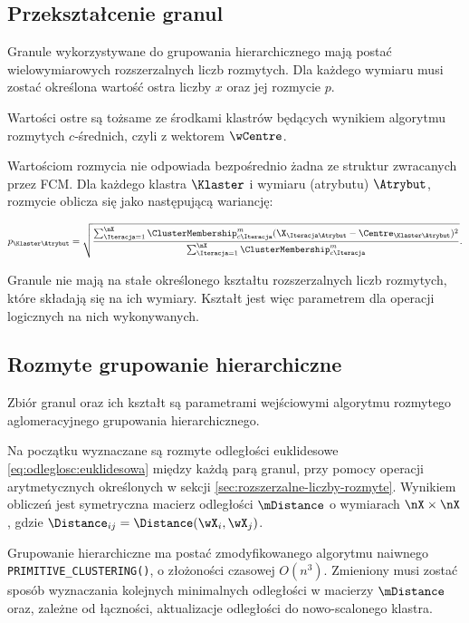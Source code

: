 \documentclass[a4paper,twoside,12pt]{book}
\begin{document}
\subsection{Przekształcenie granul}

Granule wykorzystywane do grupowania hierarchicznego mają postać wielowymiarowych rozszerzalnych liczb rozmytych. Dla każdego wymiaru musi zostać określona wartość ostra liczby $x$ oraz jej rozmycie $p$.

Wartości ostre są tożsame ze środkami klastrów będących wynikiem algorytmu rozmytych $c$-średnich, czyli z wektorem $\wCentre$.

Wartościom rozmycia nie odpowiada bezpośrednio żadna ze struktur zwracanych przez FCM. Dla każdego klastra $\Klaster$ i wymiaru (atrybutu) $\Atrybut$, rozmycie oblicza się jako następującą wariancję:

\begin{align}
	p_{\Klaster \Atrybut} = \sqrt{\frac{\sum_{\Iteracja = 1}^{\nX} \ClusterMembership_{\klaster\Iteracja}^{m} (\X_{\Iteracja\Atrybut} - \Centre_{\Klaster\Atrybut})^{2}}{\sum_{\Iteracja = 1}^{\nX} \ClusterMembership_{\klaster\Iteracja}^{m}}}.
\end{align}

Granule nie mają na stałe określonego kształtu rozszerzalnych liczb rozmytych, które składają się na ich wymiary. Kształt jest więc parametrem dla operacji logicznych na nich wykonywanych.

\subsection{Rozmyte grupowanie hierarchiczne}

Zbiór granul oraz ich kształt są parametrami wejściowymi algorytmu rozmytego aglomeracyjnego grupowania hierarchicznego.

Na początku wyznaczane są rozmyte odległości euklidesowe \ref{eq:odleglosc:euklidesowa} między każdą parą granul, przy pomocy operacji arytmetycznych określonych w sekcji \ref{sec:rozszerzalne-liczby-rozmyte}. Wynikiem obliczeń jest symetryczna macierz odległości $\mDistance$ o wymiarach $\nX \times \nX$, gdzie $\Distance_{ij} = \Distance(\wX_{i}, \wX_{j})$.

Grupowanie hierarchiczne ma postać zmodyfikowanego algorytmu naiwnego \texttt{PRIMITIVE\_CLUSTERING()}, o złożoności czasowej $O(n^{3})$. Zmieniony musi zostać sposób wyznaczania kolejnych minimalnych odległości w macierzy $\mDistance$ oraz, zależne od łączności, aktualizacje odległości do nowo-scalonego klastra. 
\end{document}

